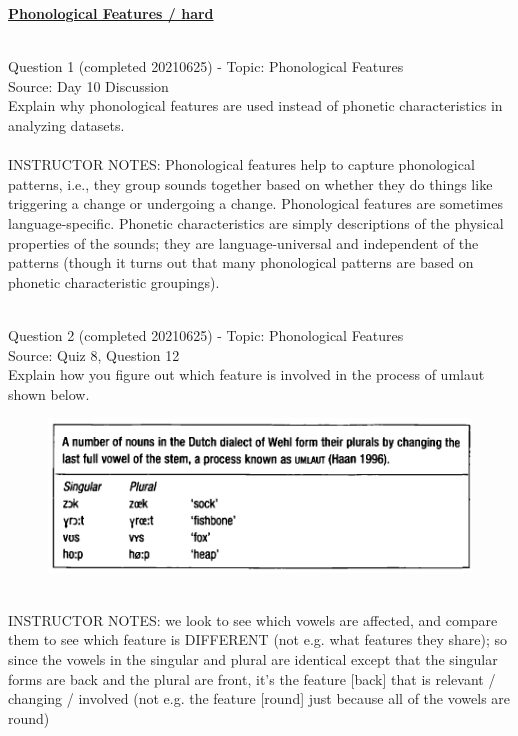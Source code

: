 \documentclass[12pt]{article}
\begin{document}
\newpage\textbf{\underline{\huge Phonological Features / hard\\}}

~\\

{\large Question 1} (completed 20210625) - Topic: Phonological Features\\
Source: Day 10 Discussion\\

Explain why phonological features are used instead of phonetic characteristics in analyzing datasets.\\


~\\
INSTRUCTOR NOTES: Phonological features help to capture phonological patterns, i.e., they group sounds together based on whether they do things like triggering a change or undergoing a change. Phonological features are sometimes language-specific. Phonetic characteristics are simply descriptions of the physical properties of the sounds; they are language-universal and independent of the patterns (though it turns out that many phonological patterns are based on phonetic characteristic groupings).


~\\

{\large Question 2} (completed 20210625) - Topic: Phonological Features\\
Source: Quiz 8, Question 12\\

Explain how you figure out which feature is involved in the process of umlaut shown below.\\

\begin{figure}[H]
\includegraphics{../images/dutch.png}
\end{figure}

~\\
INSTRUCTOR NOTES: we look to see which vowels are affected, and compare them to see which feature is DIFFERENT (not e.g. what features they share); so since the vowels in the singular and plural are identical except that the singular forms are back and the plural are front, it's the feature [back] that is relevant / changing / involved (not e.g. the feature [round] just because all of the vowels are round)
\end{document}
